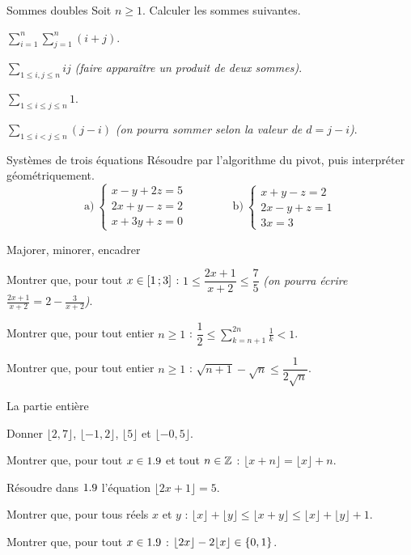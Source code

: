 \begin{exercice}[2]{Sommes doubles}
Soit $n\geq1$. Calculer les sommes suivantes.
\begin{questions}
  \item $\displaystyle\sum_{i=1}^{n}\sum_{j=1}^{n}(i+j)$.
  \item $\displaystyle\sum_{1\leq i,j\leq n}ij$\quad
    \emph{(faire apparaître un produit de deux sommes)}.
  \item $\displaystyle\sum_{1\leq i\leq j\leq n}1$.
  \item $\displaystyle\sum_{1\leq i<j\leq n}(j-i)$\quad
    \emph{(on pourra sommer selon la valeur de $d=j-i$)}.
\end{questions}
\end{exercice}

\begin{exercice}[2]{Systèmes de trois équations}
Résoudre par l'algorithme du pivot, puis interpréter géométriquement.
\[
  \text{a)}\ \begin{cases} x-y+2z=5\\ 2x+y-z=2\\ x+3y+z=0 \end{cases}
  \qquad\qquad
  \text{b)}\ \begin{cases} x+y-z=2\\ 2x-y+z=1\\ 3x=3 \end{cases}
\]
\end{exercice}

\begin{exercice}[2]{Majorer, minorer, encadrer}
\begin{questions}
  \item Montrer que, pour tout $x\in\mathopen{[}1\,{;}\,3\mathclose{]}$ :
    $1\leq\dfrac{2x+1}{x+2}\leq\dfrac{7}{5}$\quad
    \emph{(on pourra écrire $\frac{2x+1}{x+2}=2-\frac{3}{x+2}$)}.
  \item Montrer que, pour tout entier $n\geq1$ :
    $\dfrac12\leq\displaystyle\sum_{k=n+1}^{2n}\frac{1}{k}<1$.
  \item Montrer que, pour tout entier $n\geq1$ :
    $\sqrt{n+1}-\sqrt{n}\leq\dfrac{1}{2\sqrt{n}}$.
\end{questions}
\end{exercice}

\begin{exercice}[2]{La partie entière}
\begin{questions}
  \item Donner $\lfloor2{,}7\rfloor$, $\lfloor-1{,}2\rfloor$, $\lfloor5\rfloor$ et $\lfloor-0{,}5\rfloor$.
  \item Montrer que, pour tout $x\in1.9$ et tout $n\in\mathbb{Z}$ :
    $\lfloor x+n\rfloor=\lfloor x\rfloor+n$.
  \item Résoudre dans $1.9$ l'équation $\lfloor2x+1\rfloor=5$.
  \item Montrer que, pour tous réels $x$ et $y$ :
    $\lfloor x\rfloor+\lfloor y\rfloor\leq\lfloor x+y\rfloor\leq\lfloor x\rfloor+\lfloor y\rfloor+1$.
  \item Montrer que, pour tout $x\in1.9$ :
    $\lfloor2x\rfloor-2\lfloor x\rfloor\in\left\{0,1\right\}$.
\end{questions}
\end{exercice}

